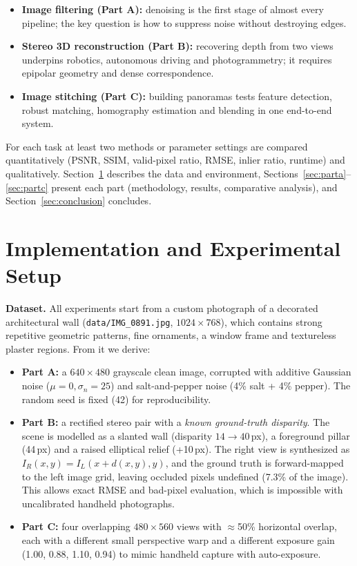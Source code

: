 \documentclass[a4paper,12pt]{article}
\begin{document}
\begin{itemize}[leftmargin=*]
    \item \textbf{Image filtering (Part A):} denoising is the first stage of almost every pipeline;
          the key question is how to suppress noise without destroying edges.
    \item \textbf{Stereo 3D reconstruction (Part B):} recovering depth from two views underpins
          robotics, autonomous driving and photogrammetry; it requires epipolar geometry and dense
          correspondence.
    \item \textbf{Image stitching (Part C):} building panoramas tests feature detection, robust
          matching, homography estimation and blending in one end-to-end system.
\end{itemize}

For each task at least two methods or parameter settings are compared quantitatively (PSNR,
SSIM, valid-pixel ratio, RMSE, inlier ratio, runtime) and qualitatively. Section~\ref{sec:setup}
describes the data and environment, Sections~\ref{sec:parta}--\ref{sec:partc} present each part
(methodology, results, comparative analysis), and Section~\ref{sec:conclusion} concludes.

\section{Implementation and Experimental Setup}\label{sec:setup}
\textbf{Dataset.} All experiments start from a custom photograph of a decorated architectural
wall (\texttt{data/IMG\_0891.jpg}, $1024\times768$), which contains strong repetitive geometric
patterns, fine ornaments, a window frame and textureless plaster regions. From it we derive:
\begin{itemize}[leftmargin=*]
    \item \textbf{Part A:} a $640\times480$ grayscale clean image, corrupted with additive Gaussian noise
          ($\mu=0,\sigma_n=25$) and salt-and-pepper noise (4\% salt + 4\% pepper). The random seed is fixed
          (42) for reproducibility.
    \item \textbf{Part B:} a rectified stereo pair with a \emph{known ground-truth disparity}. The scene
          is modelled as a slanted wall (disparity $14\rightarrow40$\,px), a foreground pillar
          (44\,px) and a raised elliptical relief (+10\,px). The right view is synthesized as
          $I_R(x,y)=I_L(x+d(x,y),y)$, and the ground truth is forward-mapped to the left image grid,
          leaving occluded pixels undefined (7.3\% of the image). This allows exact RMSE and
          bad-pixel evaluation, which is impossible with uncalibrated handheld photographs.
    \item \textbf{Part C:} four overlapping $480\times560$ views with $\approx$50\% horizontal overlap,
          each with a different small perspective warp and a different exposure gain
          (1.00, 0.88, 1.10, 0.94) to mimic handheld capture with auto-exposure.
\end{itemize}
\end{document}
